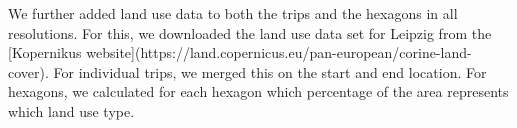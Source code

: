 

We further added land use data to both the trips and the hexagons in all resolutions. 
For this, we downloaded the land use data set for Leipzig from the [Kopernikus website](https://land.copernicus.eu/pan-european/corine-land-cover). 
For individual trips, we merged this on the start and end location. For hexagons, we calculated for each hexagon which percentage of the area represents which land use type. 


